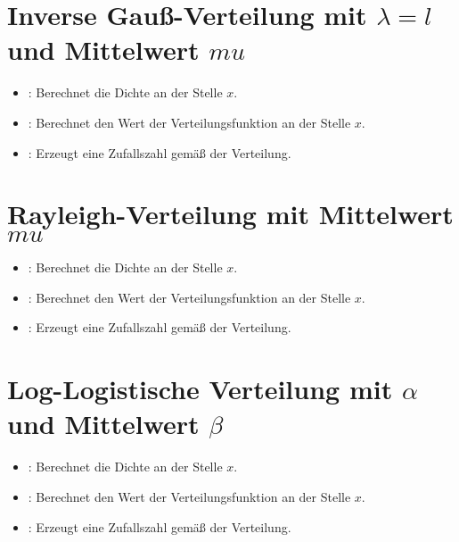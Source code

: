 	
\section{Inverse Gauß-Verteilung mit \texorpdfstring{$\lambda=l$}{l} und Mittelwert \texorpdfstring{$mu$}{mu}}

\begin{itemize}

\item
{}:
Berechnet die Dichte an der Stelle $x$.

\item
{}:
Berechnet den Wert der Verteilungsfunktion an der Stelle $x$.

\item
{}:
Erzeugt eine Zufallszahl gemäß der Verteilung.

\end{itemize}



\section{Rayleigh-Verteilung mit Mittelwert \texorpdfstring{$mu$}{mu}}

\begin{itemize}

\item
{}:
Berechnet die Dichte an der Stelle $x$.

\item
{}:
Berechnet den Wert der Verteilungsfunktion an der Stelle $x$.

\item
{}:
Erzeugt eine Zufallszahl gemäß der Verteilung.

\end{itemize}



\section{Log-Logistische Verteilung mit \texorpdfstring{$\alpha$}{alpha} und Mittelwert \texorpdfstring{$\beta$}{beta}}

\begin{itemize}

\item
{}:
Berechnet die Dichte an der Stelle $x$.

\item
{}:
Berechnet den Wert der Verteilungsfunktion an der Stelle $x$.

\item
{}:
Erzeugt eine Zufallszahl gemäß der Verteilung.

\end{itemize}



